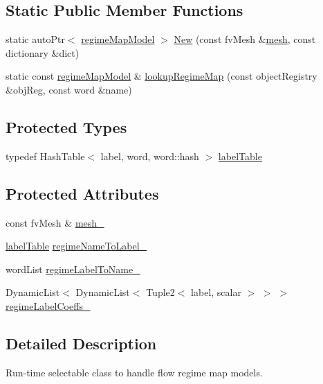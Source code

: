 \subsection*{Static Public Member Functions}
\begin{DoxyCompactItemize}
\item 
static auto\+Ptr$<$ \hyperlink{classFoam_1_1regimeMapModel}{regime\+Map\+Model} $>$ \hyperlink{classFoam_1_1regimeMapModel_a86c590b53dc81a9d5ac047f283e88b91}{New} (const fv\+Mesh \&\hyperlink{createMeshesPostProcess_8H_a8bb1e58291d2d2b653e024a4f4bffe38}{mesh}, const dictionary \&dict)
\item 
static const \hyperlink{classFoam_1_1regimeMapModel}{regime\+Map\+Model} \& \hyperlink{classFoam_1_1regimeMapModel_aea83df82d3e6130ffa3a7a3ae76c51f8}{lookup\+Regime\+Map} (const object\+Registry \&obj\+Reg, const word \&name)
\end{DoxyCompactItemize}
\subsection*{Protected Types}
\begin{DoxyCompactItemize}
\item 
typedef Hash\+Table$<$ label, word, word\+::hash $>$ \hyperlink{classFoam_1_1regimeMapModel_a5b5512e1ee06ad6419a57dd400b53807}{label\+Table}
\end{DoxyCompactItemize}
\subsection*{Protected Attributes}
\begin{DoxyCompactItemize}
\item 
const fv\+Mesh \& \hyperlink{classFoam_1_1regimeMapModel_a23edeeeecebcef11921a33dd5d990570}{mesh\+\_\+}
\item 
\hyperlink{classFoam_1_1regimeMapModel_a5b5512e1ee06ad6419a57dd400b53807}{label\+Table} \hyperlink{classFoam_1_1regimeMapModel_ad59d48ef062ad72a85a8b6607a58290b}{regime\+Name\+To\+Label\+\_\+}
\item 
word\+List \hyperlink{classFoam_1_1regimeMapModel_a0eb03bea6278f16e3d0c8e61448ca869}{regime\+Label\+To\+Name\+\_\+}
\item 
Dynamic\+List$<$ Dynamic\+List$<$ Tuple2$<$ label, scalar $>$ $>$ $>$ \hyperlink{classFoam_1_1regimeMapModel_a4abafec3410292daed9d27a25787f03f}{regime\+Label\+Coeffs\+\_\+}
\end{DoxyCompactItemize}


\subsection{Detailed Description}
Run-\/time selectable class to handle flow regime map models. 

